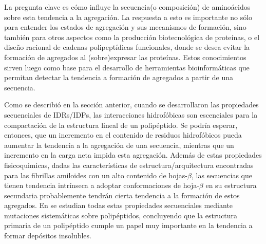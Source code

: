 
La pregunta clave es cómo influye la secuencia(o composición) de aminoácidos sobre esta tendencia a la agregación.
La respuesta a esto es importante no sólo para entender los estados de agregación y sus mecanismos de formación, sino también para otros aspectos como 
la producción biotecnológica de proteínas, o el diseño racional de cadenas polipeptídicas funcionales, donde se desea evitar la formación de agregados al (sobre)expresar las proteínas.
Estos conocimientos sirven luego como base para el desarrollo de herramientas bioinformáticas que permitan detectar la tendencia a formación de agregados a partir de una secuencia.

Como se describió en la sección anterior, cuando se desarrollaron las propiedades secuenciales de IDRs/IDPs, las interacciones hidrofóbicas son escenciales para la compactación de la estructura lineal de un polipéptido.
Se podría esperar, entonces, que un incremento en el contenido de residuos hidrofóbicos pueda aumentar la tendencia a la agregación de una secuencia, mientras que un incremento en la carga neta impida esta agregación. 
Además de estas propiedades fisicoquimicas, dadas las características de estructura/arquitectura encontradas para las fibrillas amiloides con un alto contenido de hojas-$\beta$,
las secuencias que tienen tendencia intrínseca a adoptar conformaciones de hoja-$\beta$ en su estructura secundaria probablemente tendrán cierta tendencia a la formación de estos agregados.  
En \cite{chiti2003rationalization} se estudian todas estas propiedades secuenciales mediante mutaciones sistemáticas sobre polipéptidos, concluyendo 
que la estructura primaria de un polipéptido cumple un papel muy importante en la tendencia a formar depósitos insolubles.

